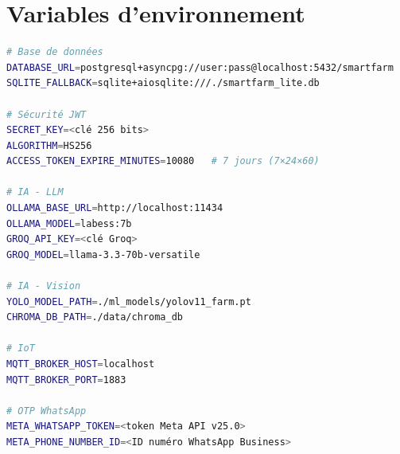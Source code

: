 \chapter{Variables d'environnement}
\label{ann:envvars}

\begin{lstlisting}[language=bash, caption={Variables d'environnement backend (.env)}]
# Base de données
DATABASE_URL=postgresql+asyncpg://user:pass@localhost:5432/smartfarm
SQLITE_FALLBACK=sqlite+aiosqlite:///./smartfarm_lite.db

# Sécurité JWT
SECRET_KEY=<clé 256 bits>
ALGORITHM=HS256
ACCESS_TOKEN_EXPIRE_MINUTES=10080   # 7 jours (7×24×60)

# IA - LLM
OLLAMA_BASE_URL=http://localhost:11434
OLLAMA_MODEL=labess:7b
GROQ_API_KEY=<clé Groq>
GROQ_MODEL=llama-3.3-70b-versatile

# IA - Vision
YOLO_MODEL_PATH=./ml_models/yolov11_farm.pt
CHROMA_DB_PATH=./data/chroma_db

# IoT
MQTT_BROKER_HOST=localhost
MQTT_BROKER_PORT=1883

# OTP WhatsApp
META_WHATSAPP_TOKEN=<token Meta API v25.0>
META_PHONE_NUMBER_ID=<ID numéro WhatsApp Business>
\end{lstlisting}

